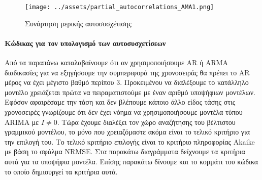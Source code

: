 \documentclass[11pt,]{article}
\newenvironment{Shaded}{}{}
\newcommand{\CommentTok}[1]{\textcolor[rgb]{0.38,0.63,0.69}{\textit{#1}}}
\newcommand{\FloatTok}[1]{\textcolor[rgb]{0.25,0.63,0.44}{#1}}
\newcommand{\NormalTok}[1]{#1}
\newcommand{\StringTok}[1]{\textcolor[rgb]{0.25,0.44,0.63}{#1}}
\let\oldparagraph\paragraph
\renewcommand{\paragraph}[1]{\oldparagraph{#1}\mbox{}}
\begin{document}
\begin{figure}
\centering
\texttt{[image: ../assets/partial\_autocorrelations\_AMA1.png]}
\caption{Συνάρτηση μερικής αυτοσυσχέτισης}
\end{figure}

\hypertarget{ux3baux3ceux3b4ux3b9ux3baux3b1ux3c2-ux3b3ux3b9ux3b1-ux3c4ux3bfux3bd-ux3c5ux3c0ux3bfux3bbux3bfux3b3ux3b9ux3c3ux3bcux3cc-ux3c4ux3c9ux3bd-ux3b1ux3c5ux3c4ux3bfux3c3ux3c5ux3c3ux3c7ux3b5ux3c4ux3afux3c3ux3b5ux3c9ux3bd}{%
\paragraph{Κώδικας για τον υπολογισμό των
αυτοσυσχετίσεων}\label{ux3baux3ceux3b4ux3b9ux3baux3b1ux3c2-ux3b3ux3b9ux3b1-ux3c4ux3bfux3bd-ux3c5ux3c0ux3bfux3bbux3bfux3b3ux3b9ux3c3ux3bcux3cc-ux3c4ux3c9ux3bd-ux3b1ux3c5ux3c4ux3bfux3c3ux3c5ux3c3ux3c7ux3b5ux3c4ux3afux3c3ux3b5ux3c9ux3bd}}

\begin{Shaded}
\end{Shaded}

Από τα παραπάνω καταλαβαίνουμε ότι αν χρησιμοποιήσουμε AR ή ARMA
διαδικασίες για να εξηγήσουμε την συμπεριφορά της χρονοσειράς θα πρέπει
το AR μέρος να έχει μέγιστο βαθμό περίπου 3. Προκειμένου να διαλέξουμε
το κατάλληλο μοντέλο χρειάζεται πρώτα να πειραματιστούμε με έναν αριθμό
υποψήφιων μοντέλων. Εφόσον αφαιρέσαμε την τάση και δεν βλέπουμε κάποιο
άλλο είδος τάσης στις χρονοσειρές γνωρίζουμε ότι δεν έχει νόημα να
χρησιμοποιήσουμε μοντέλα τύπου ARIMA με \(I \neq 0\). Τώρα έχουμε
διαλέξει τον χώρο αναζήτησης του βέλτιστου γραμμικού μοντέλου, το μόνο
που χρειαζόμαστε ακόμα είναι το τελικό κριτήριο για την επιλογή του. Το
τελικό κριτήριο επιλογής είναι το κριτήριο πληροφορίας Akaike με βάση το
σφάλμα NRMSE. Στα παρακάτω διαγράμματα δείχνουμε τα κριτήρια αυτά για τα
υποψήφια μοντέλα. Επίσης παρακάτω δίνουμε και το κομμάτι του κώδικα το
οποίο δημιουργεί τα κριτήρια αυτά.
\end{document}
